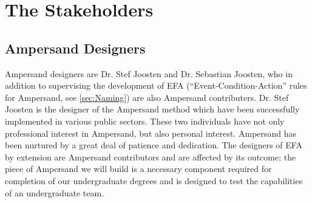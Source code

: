 \documentclass[12pt]{report}
\begin{document}
\section{The Stakeholders}\label{sec:Stakeholders}

\subsection{Ampersand Designers}\label{subsec:Ampersand}
Ampersand designers are Dr. Stef Joosten and Dr. Sebastian Joosten, who in
addition to supervising the development of EFA (``Event-Condition-Action'' rules
for Ampersand, see \ref{sec:Naming}) are also Ampersand
contributers. Dr. Stef Joosten is the designer of the Ampersand method which
have been successfully implemented in various public sectors. These two individuals have not only professional interest in Ampersand, but also personal interest.
Ampersand has been nurtured by a great deal of patience and
dedication. The designers of EFA by extension are Ampersand contributors and
are affected by its outcome; the piece of Ampersand we will build is a necessary
component required for completion of our undergraduate degrees and is designed to test the
capabilities of an undergraduate team. 
\end{document}
